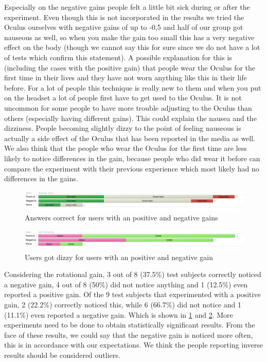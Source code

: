 Especially on the negative gains people felt a little bit sick during or after the experiment.
Even though this is not incorporated in the results we tried the Oculus ourselves with negative gains of up to -0,5 and half of our group got nauseous as well, so when you make the gain too small this has a very negative effect on the body (though we cannot say this for sure since we do not have a lot of tests which confirm this statement).
A possible explanation for this is (including the cases with the positive gain) that people wear the Oculus for the first time in their lives and they have not worn anything like this in their life before.
For a lot of people this technique is really new to them and when you put on the headset a lot of people first have to get used to the Oculus. 
It is not uncommon for some people to have more trouble adjusting to the Oculus than others (especially having different gains).
This could explain the nausea and the dizziness.
People becoming slightly dizzy to the point of feeling nauseous is actually a side effect of the Oculus that has been reported in the media as well.
We also think that the people who wear the Oculus  for the first time are less likely to notice differences in the gain, because people who did wear it before can compare the experiment with their previous experience which most likely had no differences in the gains. 

\begin{figure}[htb]
	\centering
	\includegraphics[width=\linewidth]{sections/finalreport/images/graph1.png}	
	\caption{Answers correct for users with an positive and negative gains}
	\label{fig:grp1}
\end{figure}
\begin{figure}[htb]
	\centering
	\includegraphics[width=\linewidth]{sections/finalreport/images/graph2.png}	
	\caption{Users got dizzy for users with an positive and negative gain}
	\label{fig:grp2}
\end{figure}

Considering the rotational gain, 3 out of 8 (37.5\%) test subjects correctly noticed a negative gain, 4 out of 8 (50\%) did not notice anything and 1 (12.5\%) even reported a positive gain.
Of the 9 test subjects that experimented with a positive gain, 2 (22.2\%) correctly noticed this, while 6 (66.7\%) did not notice and 1 (11.1\%) even reported a negative gain. Which is shown in  \ref{fig:grp1} and \ref{fig:grp2}.
More experiments need to be done to obtain statistically significant results.
From the face of these results, we could say that the negative gain is noticed more often, this is in accordance with our expectations.
We think the people reporting inverse results should be considered outliers.

